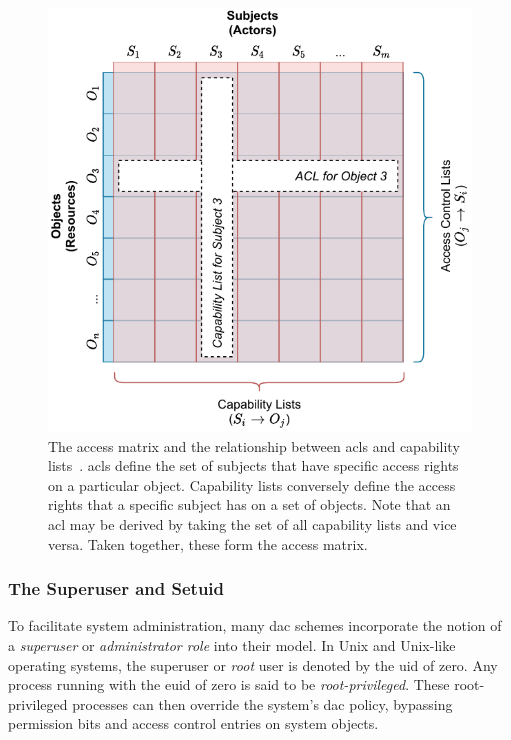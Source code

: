\begin{figure}[htbp]
  \centering
  \includegraphics[width=0.8\linewidth]{figs/background/acl.pdf}
  \caption[The access matrix]{
    The access matrix and the relationship between \glspl{acl} and capability
    lists~\cite{anderson1972_report, van_oorschot2020_tools_jewels,
    jaeger2008_os_security}. \glspl{acl} define the set of subjects that have specific
    access rights on a particular object. Capability lists conversely define the access
    rights that a specific subject has on a set of objects. Note that an \gls{acl} may be
    derived by taking the set of all capability lists and vice versa. Taken together,
    these form the access matrix.
  }%
  \label{fig:acl}
\end{figure}

\subsubsection*{The Superuser and Setuid}

To facilitate system administration, many \gls{dac} schemes incorporate the notion of
a \textit{superuser} or \textit{administrator role} into their model. In Unix and
Unix-like operating systems, the superuser or \textit{root} user is denoted by the
\gls{uid} of zero. Any process running with the \gls{euid} of zero is said to be
\textit{root-privileged}. These root-privileged processes can then override the system's
\gls{dac} policy, bypassing permission bits and access control entries on system objects.

